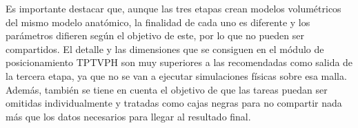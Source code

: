 


Es importante destacar que, aunque las tres etapas crean modelos volumétricos del mismo modelo anatómico, la finalidad de cada uno es diferente y los parámetros difieren según el objetivo de este, por lo que no pueden ser compartidos. El detalle y las dimensiones que se consiguen en el módulo de posicionamiento \ac{TPTVPH} son muy superiores a las recomendadas como salida de la tercera etapa, ya que no se van a ejecutar simulaciones físicas sobre esa malla. Además, también se tiene en cuenta el objetivo de que las tareas puedan ser omitidas individualmente y tratadas como cajas negras para no compartir nada más que los datos necesarios para llegar al resultado final.




